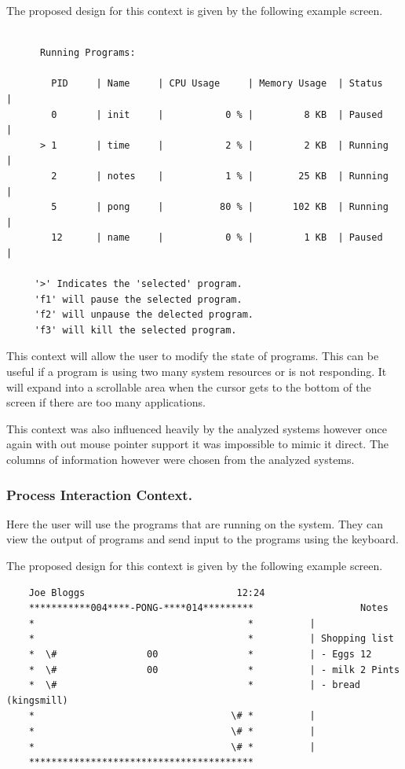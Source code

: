 \documentclass[a4paper]{report}
\begin{document}
The proposed design for this context is given by the following example screen.

{\ttfamily \small
  \begin{framed}
    \begin{verbatim}

      Running Programs:

        PID     | Name     | CPU Usage     | Memory Usage  | Status     |
        0       | init     |           0 % |         8 KB  | Paused     |
      > 1       | time     |           2 % |         2 KB  | Running    |
        2       | notes    |           1 % |        25 KB  | Running    |
        5       | pong     |          80 % |       102 KB  | Running    |
        12      | name     |           0 % |         1 KB  | Paused     |

     '>' Indicates the 'selected' program.
     'f1' will pause the selected program.
     'f2' will unpause the delected program.
     'f3' will kill the selected program.

    \end{verbatim}
  \end{framed}
}

This context will allow the user to modify the state of programs. This can be useful if a program is using two many system resources or is not responding. It will expand into a scrollable area when the cursor gets to the bottom of the screen if there are too many applications.

This context was also influenced heavily by the analyzed systems however once again with out mouse pointer support it was impossible to mimic it direct. The columns of information however were chosen from the analyzed systems.

\subsubsection*{Process Interaction Context.}

Here the user will use the programs that are running on the system. They can view the output of programs and send input to the programs using the keyboard.

The proposed design for this context is given by the following example screen.

{\ttfamily \small
  \begin{framed}
    \begin{verbatim}
    Joe Bloggs                           12:24
    ***********004****-PONG-****014*********                   Notes
    *                                      *          |
    *                                      *          | Shopping list
    *  \#                00                *          | - Eggs 12
    *  \#                00                *          | - milk 2 Pints
    *  \#                                  *          | - bread (kingsmill)
    *                                   \# *          |
    *                                   \# *          |
    *                                   \# *          |
    ****************************************
    \end{verbatim}
  \end{framed}
}
\end{document}
